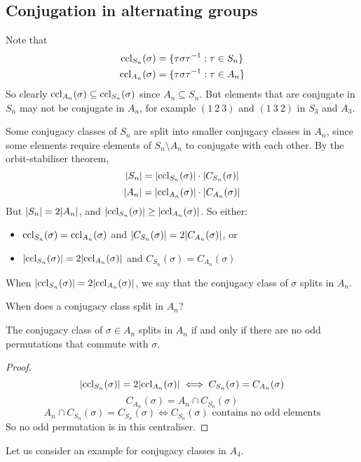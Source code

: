 \subsection{Conjugation in alternating groups}
Note that
\begin{align*}
	\operatorname{ccl}_{S_n}(\sigma) & = \{ \tau \sigma \tau^{-1} : \tau \in S_n \} \\
	\operatorname{ccl}_{A_n}(\sigma) & = \{ \tau \sigma \tau^{-1} : \tau \in A_n \}
\end{align*}
So clearly \(\operatorname{ccl}_{A_n}(\sigma) \subseteq \operatorname{ccl}_{S_n}(\sigma)\) since \(A_n \subseteq S_n\).
But elements that are conjugate in \(S_n\) may not be conjugate in \(A_n\), for example \((1\ 2\ 3)\) and \((1\ 3\ 2)\) in \(S_3\) and \(A_3\).

Some conjugacy classes of \(S_n\) are split into smaller conjugacy classes in \(A_n\), since some elements require elements of \(S_n \setminus A_n\) to conjugate with each other.
By the orbit-stabiliser theorem,
\[
	\abs{S_n} = \abs{\operatorname{ccl}_{S_n}(\sigma)} \cdot \abs{C_{S_n}(\sigma)}
\]
\[
	\abs{A_n} = \abs{\operatorname{ccl}_{A_n}(\sigma)} \cdot \abs{C_{A_n}(\sigma)}
\]
But \(\abs{S_n} = 2\abs{A_n}\), and \(\abs{\operatorname{ccl}_{S_n}(\sigma)} \geq \abs{\operatorname{ccl}_{A_n}(\sigma)}\).
So either:
\begin{itemize}
	\item \(\operatorname{ccl}_{S_n}(\sigma) = \operatorname{ccl}_{A_n}(\sigma)\) and \(\abs{C_{S_n}(\sigma)} = 2\abs{C_{A_n}(\sigma)}\), or
	\item \(\abs{\operatorname{ccl}_{S_n}(\sigma)} = 2 \abs{\operatorname{ccl}_{A_n}(\sigma)}\) and \(C_{S_n}(\sigma) = C_{A_n}(\sigma)\)
\end{itemize}
\begin{definition}
	When \(\abs{\operatorname{ccl}_{S_n}(\sigma)} = 2 \abs{\operatorname{ccl}_{A_n}(\sigma)}\), we say that the conjugacy class of \(\sigma\) splits in \(A_n\).
\end{definition}
When does a conjugacy class split in \(A_n\)?
\begin{proposition}
	The conjugacy class of \(\sigma \in A_n\) splits in \(A_n\) if and only if there are no odd permutations that commute with \(\sigma\).
\end{proposition}
\begin{proof}
	\[
		\abs{\operatorname{ccl}_{S_n}(\sigma)} = 2 \abs{\operatorname{ccl}_{A_n}(\sigma)} \iff C_{S_n}(\sigma) = C_{A_n}(\sigma)
	\]
	\[
		C_{A_n}(\sigma) = A_n \cap C_{S_n}(\sigma)
	\]
	\[
		A_n \cap C_{S_n}(\sigma) = C_{S_n}(\sigma) \iff C_{S_n}(\sigma)\text{ contains no odd elements}
	\]
	So no odd permutation is in this centraliser.
\end{proof}
Let us consider an example for conjugacy classes in \(A_4\).

